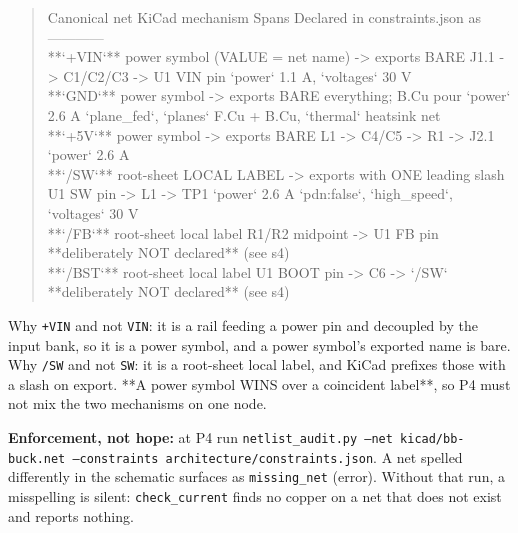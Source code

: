 \documentclass[11pt,a4paper]{article}
\begin{document}
\begin{quote}\small\ttfamily\raggedright
\textbar{} Canonical net \textbar{} KiCad mechanism \textbar{} Spans \textbar{} Declared in constraints.json as \textbar{}\\
\textbar{}---\textbar{}---\textbar{}---\textbar{}---\textbar{}\\
\textbar{} {*}{*}`+VIN`{*}{*} \textbar{} power symbol (VALUE = net name) -\textgreater{} exports BARE \textbar{} J1.1 -\textgreater{} C1/C2/C3 -\textgreater{} U1 VIN pin \textbar{} `power` 1.1 A, `voltages` 30 V \textbar{}\\
\textbar{} {*}{*}`GND`{*}{*} \textbar{} power symbol -\textgreater{} exports BARE \textbar{} everything; B.Cu pour \textbar{} `power` 2.6 A `plane\_fed`, `planes` F.Cu + B.Cu, `thermal` heatsink net \textbar{}\\
\textbar{} {*}{*}`+5V`{*}{*} \textbar{} power symbol -\textgreater{} exports BARE \textbar{} L1 -\textgreater{} C4/C5 -\textgreater{} R1 -\textgreater{} J2.1 \textbar{} `power` 2.6 A \textbar{}\\
\textbar{} {*}{*}`/SW`{*}{*} \textbar{} root-sheet LOCAL LABEL -\textgreater{} exports with ONE leading slash \textbar{} U1 SW pin -\textgreater{} L1 -\textgreater{} TP1 \textbar{} `power` 2.6 A `pdn:false`, `high\_speed`, `voltages` 30 V \textbar{}\\
\textbar{} {*}{*}`/FB`{*}{*} \textbar{} root-sheet local label \textbar{} R1/R2 midpoint -\textgreater{} U1 FB pin \textbar{} {*}{*}deliberately NOT declared{*}{*} (see s4) \textbar{}\\
\textbar{} {*}{*}`/BST`{*}{*} \textbar{} root-sheet local label \textbar{} U1 BOOT pin -\textgreater{} C6 -\textgreater{} `/SW` \textbar{} {*}{*}deliberately NOT declared{*}{*} (see s4) \textbar{}
\end{quote}
Why \texttt{+VIN} and not \texttt{VIN}: it is a rail feeding a power pin and decoupled by the input bank, so it is a power symbol, and a power symbol's exported name is bare. Why \texttt{/SW} and not \texttt{SW}: it is a root-sheet local label, and KiCad prefixes those with a slash on export. {*}{*}A power symbol WINS over a coincident label{*}{*}, so P4 must not mix the two mechanisms on one node.

\textbf{Enforcement, not hope:} at P4 run \texttt{netlist\_audit.py --net kicad/bb-buck.net --constraints architecture/constraints.json}. A net spelled differently in the schematic surfaces as \texttt{missing\_net} (error). Without that run, a misspelling is silent: \texttt{check\_current} finds no copper on a net that does not exist and reports nothing.
\end{document}

